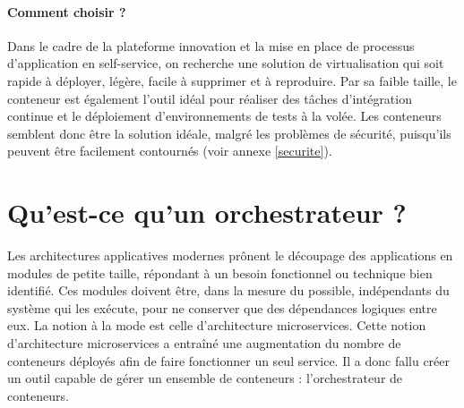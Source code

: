 \documentclass[11pt,fleqn]{book} %
\begin{document}
\begin{interrupt}
\paragraph{Comment choisir ?}
Dans le cadre de la plateforme innovation et la mise en place de processus d'application en self-service, on recherche une solution de virtualisation qui soit rapide à  déployer, légère, facile à supprimer et à reproduire. Par sa faible taille, le conteneur est également l'outil idéal pour réaliser des tâches d'intégration continue et le déploiement d'environnements de tests à la volée. Les conteneurs semblent donc être la solution idéale, malgré les problèmes de sécurité, puisqu'ils peuvent être facilement contournés (voir annexe \ref{securite}).
\end{interrupt}

\section{Qu'est-ce qu'un orchestrateur ? }
Les architectures applicatives modernes prônent le découpage des applications en modules de petite taille, répondant à un besoin fonctionnel ou technique bien identifié. Ces modules doivent être, dans la mesure du possible, indépendants du système qui les exécute, pour ne conserver que des dépendances logiques entre eux. La notion à la mode est celle d’architecture microservices. Cette notion d'architecture microservices a entraîné une augmentation du nombre de conteneurs déployés afin de faire fonctionner un seul service. Il a donc fallu créer un outil capable de gérer un ensemble de conteneurs : l'orchestrateur de conteneurs.\\ 
\end{document}
